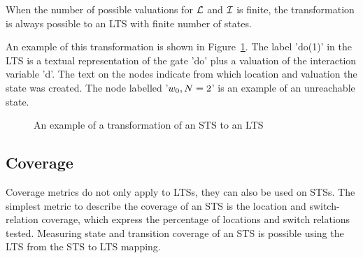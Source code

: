 \begin{comment}
These relations are constructed as follows: for a switch relation $r$ from location $A$ to location $B$, a valuation of the location variables $\nu_l$ and interaction variables $\nu_i$, $\mu_l:(A,\nu_l)$ maps to a state $q$, where $q$ is the source state of a transition $t$, if the result of the valuation $\nu:(\phi$ of $r, \nu_l \cup \nu_i)$ is true. $\nu_{l_new}$ is the new valuation of the location variables constructed by the valuation of $\rho$ of $r$. Then, the target state $q'$ of $t$ is the state mapped by $\mu_l:(B,\nu_{l_new}$). The label of $t$ is a textual representation of $\Gates$ of $r$ and $\nu_i$. Applying this rule for the topology to all locations, switch relations and concrete values for the variables, results in $L$. The start state $q0$ of $L$ is the state mapped by $\mu_l:(l_0,\initializationFunction)$. All states not reachable from $q0$ are removed from $L$.
\end{comment}

When the number of possible valuations for $\mathcal{L}$ and $\mathcal{I}$ is finite, the transformation is always possible to an LTS with finite number of states.

An example of this transformation is shown in Figure~\ref{fig:example_trafo}. The label 'do(1)' in the LTS is a textual representation of the gate 'do' plus a valuation of the interaction variable 'd'. The text on the nodes indicate from which location and valuation the state was created. The node labelled '$w_0, N=2$' is an example of an unreachable state.  %

\begin{figure}[ht]
  \begin{center}
    \hspace{20px}
  \end{center}
  \caption{An example of a transformation of an STS to an LTS}
  \label{fig:example_trafo}
\end{figure}

\subsection{Coverage}\label{sec:sts_coverage}
Coverage metrics do not only apply to LTSs, they can also be used on STSs. The simplest metric to describe the coverage of an STS is the location and switch-relation coverage, which express the percentage of locations and switch relations tested. Measuring state and transition coverage of an STS is possible using the LTS from the STS to LTS mapping. 

